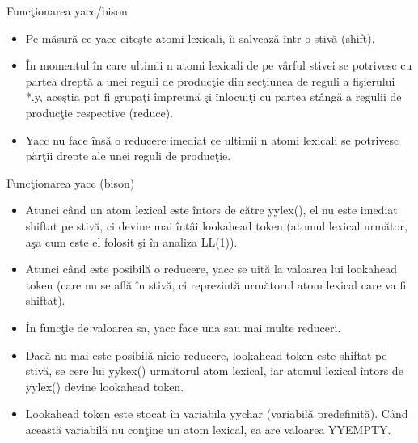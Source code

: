 \documentclass[pdf]{beamer}
\begin{document}
\begin{frame}{Funcţionarea yacc/bison}
\begin{itemize}
	\item
	Pe măsură ce yacc citeşte atomi lexicali, îi salvează într-o stivă (shift). 

	\item
	În momentul în care ultimii n atomi lexicali de pe vârful stivei se potrivesc cu partea dreptă a unei reguli de producţie din secţiunea de reguli a fişierului *.y, aceştia pot fi grupaţi împreună şi înlocuiţi cu partea stângă a regulii de producţie respective (reduce).

	\item
	Yacc nu face însă o reducere imediat ce ultimii n atomi lexicali se potrivesc părţii drepte ale unei reguli de producţie.

\end{itemize}
\end{frame}



\begin{frame}{Funcţionarea yacc (bison)}
\begin{itemize}
	\item
	Atunci când un atom lexical este întors de către yylex(), el nu este imediat shiftat pe stivă, ci devine mai întâi  {\color{red}lookahead token} (atomul lexical următor, aşa cum este el folosit şi în analiza LL(1)).
 
	\item
	Atunci când este posibilă o reducere, yacc se uită la valoarea lui lookahead token (care nu se află în stivă, ci reprezintă următorul atom lexical care va fi shiftat).

	\item
	În funcţie de valoarea sa, yacc face una sau mai multe reduceri.

	\item
	Dacă nu mai este posibilă nicio reducere, lookahead token este shiftat pe stivă, se cere lui yykex() următorul atom lexical, iar atomul lexical întors de yylex() devine lookahead token.

	\item
	Lookahead token este stocat în variabila {\color{red} yychar} (variabilă predefinită). Când această variabilă nu conţine un atom lexical, ea are valoarea {\color{red}YYEMPTY}.

\end{itemize}
\end{frame}
\end{document}
